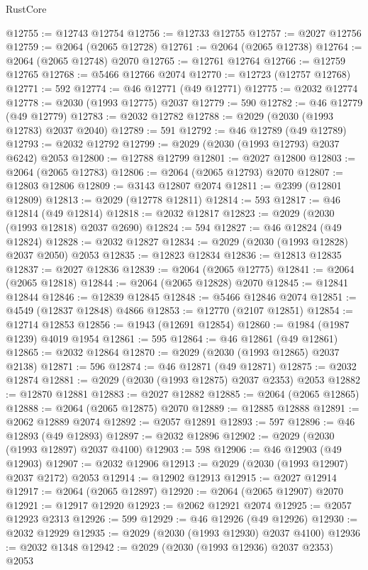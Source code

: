 \begin{lexlean}{RustCore}
\begin{coremodule}
@12755 := @12743 @12754
@12756 := @12733 @12755
@12757 := @2027 @12756
@12759 := @2064 (@2065 @12728)
@12761 := @2064 (@2065 @12738)
@12764 := @2064 (@2065 @12748) @2070
@12765 := @12761 @12764
@12766 := @12759 @12765
@12768 := @5466 @12766 @2074
@12770 := @12723 (@12757 @12768)
@12771 := 592
@12774 := @46 @12771 (@49 @12771)
@12775 := @2032 @12774
@12778 := @2030 (@1993 @12775) @2037
@12779 := 590
@12782 := @46 @12779 (@49 @12779)
@12783 := @2032 @12782
@12788 := @2029 (@2030 (@1993 @12783) @2037 @2040)
@12789 := 591
@12792 := @46 @12789 (@49 @12789)
@12793 := @2032 @12792
@12799 := @2029 (@2030 (@1993 @12793) @2037 @6242) @2053
@12800 := @12788 @12799
@12801 := @2027 @12800
@12803 := @2064 (@2065 @12783)
@12806 := @2064 (@2065 @12793) @2070
@12807 := @12803 @12806
@12809 := @3143 @12807 @2074
@12811 := @2399 (@12801 @12809)
@12813 := @2029 (@12778 @12811)
@12814 := 593
@12817 := @46 @12814 (@49 @12814)
@12818 := @2032 @12817
@12823 := @2029 (@2030 (@1993 @12818) @2037 @2690)
@12824 := 594
@12827 := @46 @12824 (@49 @12824)
@12828 := @2032 @12827
@12834 := @2029 (@2030 (@1993 @12828) @2037 @2050) @2053
@12835 := @12823 @12834
@12836 := @12813 @12835
@12837 := @2027 @12836
@12839 := @2064 (@2065 @12775)
@12841 := @2064 (@2065 @12818)
@12844 := @2064 (@2065 @12828) @2070
@12845 := @12841 @12844
@12846 := @12839 @12845
@12848 := @5466 @12846 @2074
@12851 := @4549 (@12837 @12848) @4866
@12853 := @12770 (@2107 @12851)
@12854 := @12714 @12853
@12856 := @1943 (@12691 @12854)
@12860 := @1984 (@1987 @1239) @4019 @1954
@12861 := 595
@12864 := @46 @12861 (@49 @12861)
@12865 := @2032 @12864
@12870 := @2029 (@2030 (@1993 @12865) @2037 @2138)
@12871 := 596
@12874 := @46 @12871 (@49 @12871)
@12875 := @2032 @12874
@12881 := @2029 (@2030 (@1993 @12875) @2037 @2353) @2053
@12882 := @12870 @12881
@12883 := @2027 @12882
@12885 := @2064 (@2065 @12865)
@12888 := @2064 (@2065 @12875) @2070
@12889 := @12885 @12888
@12891 := @2062 @12889 @2074
@12892 := @2057 @12891
@12893 := 597
@12896 := @46 @12893 (@49 @12893)
@12897 := @2032 @12896
@12902 := @2029 (@2030 (@1993 @12897) @2037 @4100)
@12903 := 598
@12906 := @46 @12903 (@49 @12903)
@12907 := @2032 @12906
@12913 := @2029 (@2030 (@1993 @12907) @2037 @2172) @2053
@12914 := @12902 @12913
@12915 := @2027 @12914
@12917 := @2064 (@2065 @12897)
@12920 := @2064 (@2065 @12907) @2070
@12921 := @12917 @12920
@12923 := @2062 @12921 @2074
@12925 := @2057 @12923 @2313
@12926 := 599
@12929 := @46 @12926 (@49 @12926)
@12930 := @2032 @12929
@12935 := @2029 (@2030 (@1993 @12930) @2037 @4100)
@12936 := @2032 @1348
@12942 := @2029 (@2030 (@1993 @12936) @2037 @2353) @2053

\end{coremodule}
\end{lexlean}
